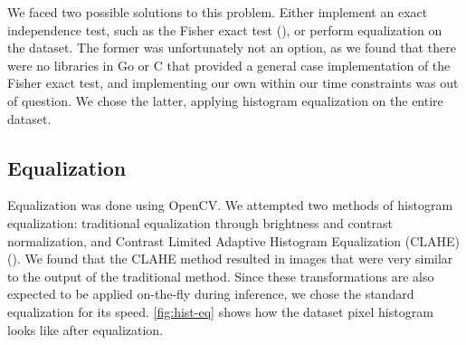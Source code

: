 We faced two possible solutions to this problem. Either implement an exact independence test, such
as the Fisher exact test (\cite{fisher-exact}), or perform equalization on the dataset. The former
was unfortunately not an option, as we found that there were no libraries in Go or C that provided
a general case implementation of the Fisher exact test, and implementing our own within our time
constraints was out of question. We chose the latter, applying histogram equalization on the entire
dataset.

\subsection{Equalization}

Equalization was done using OpenCV. We attempted two methods of histogram equalization: traditional
equalization through brightness and contrast normalization, and Contrast Limited Adaptive Histogram
Equalization (CLAHE) (\cite{clahe}). We found that the CLAHE method resulted in images that were
very similar to the output of the traditional method. Since these transformations are also expected
to be applied on-the-fly during inference, we chose the standard equalization for its speed.
\autoref{fig:hist-eq} shows how the dataset pixel histogram looks like after equalization.

